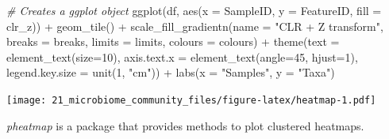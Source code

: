 \documentclass[
]{book}
\newenvironment{Shaded}{\begin{snugshade}}{\end{snugshade}}
\newcommand{\AttributeTok}[1]{\textcolor[rgb]{0.77,0.63,0.00}{#1}}
\newcommand{\CommentTok}[1]{\textcolor[rgb]{0.56,0.35,0.01}{\textit{#1}}}
\newcommand{\DecValTok}[1]{\textcolor[rgb]{0.00,0.00,0.81}{#1}}
\newcommand{\FunctionTok}[1]{\textcolor[rgb]{0.00,0.00,0.00}{#1}}
\newcommand{\NormalTok}[1]{#1}
\newcommand{\SpecialCharTok}[1]{\textcolor[rgb]{0.00,0.00,0.00}{#1}}
\newcommand{\StringTok}[1]{\textcolor[rgb]{0.31,0.60,0.02}{#1}}
\begin{document}
\begin{Shaded}
\begin{Highlighting}[]
\CommentTok{\# Creates a ggplot object}
\FunctionTok{ggplot}\NormalTok{(df, }\FunctionTok{aes}\NormalTok{(}\AttributeTok{x =}\NormalTok{ SampleID, }\AttributeTok{y =}\NormalTok{ FeatureID, }\AttributeTok{fill =}\NormalTok{ clr\_z)) }\SpecialCharTok{+}
  \FunctionTok{geom\_tile}\NormalTok{() }\SpecialCharTok{+}
  \FunctionTok{scale\_fill\_gradientn}\NormalTok{(}\AttributeTok{name =} \StringTok{"CLR + Z transform"}\NormalTok{, }
                       \AttributeTok{breaks =}\NormalTok{ breaks, }\AttributeTok{limits =}\NormalTok{ limits, }\AttributeTok{colours =}\NormalTok{ colours) }\SpecialCharTok{+} 
  \FunctionTok{theme}\NormalTok{(}\AttributeTok{text =} \FunctionTok{element\_text}\NormalTok{(}\AttributeTok{size=}\DecValTok{10}\NormalTok{),}
        \AttributeTok{axis.text.x =} \FunctionTok{element\_text}\NormalTok{(}\AttributeTok{angle=}\DecValTok{45}\NormalTok{, }\AttributeTok{hjust=}\DecValTok{1}\NormalTok{),}
        \AttributeTok{legend.key.size =} \FunctionTok{unit}\NormalTok{(}\DecValTok{1}\NormalTok{, }\StringTok{"cm"}\NormalTok{)) }\SpecialCharTok{+}
  \FunctionTok{labs}\NormalTok{(}\AttributeTok{x =} \StringTok{"Samples"}\NormalTok{, }\AttributeTok{y =} \StringTok{"Taxa"}\NormalTok{)}
\end{Highlighting}
\end{Shaded}

\texttt{[image: 21\_microbiome\_community\_files/figure-latex/heatmap-1.pdf]}

\emph{pheatmap} is a package that provides methods to plot clustered heatmaps.
\end{document}

